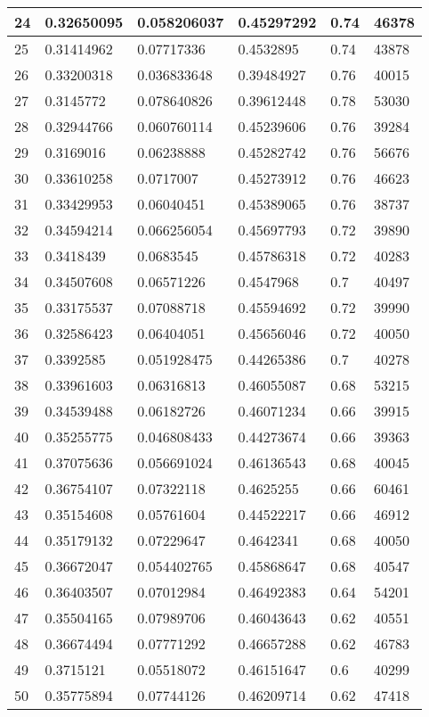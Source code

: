 \begin{longtable}{|l|l|l|l|l|l|}
24 & 0.32650095 & 0.058206037 & 0.45297292 & 0.74 & 46378 \\ \hline 
25 & 0.31414962 & 0.07717336 & 0.4532895 & 0.74 & 43878 \\ \hline 
26 & 0.33200318 & 0.036833648 & 0.39484927 & 0.76 & 40015 \\ \hline 
27 & 0.3145772 & 0.078640826 & 0.39612448 & 0.78 & 53030 \\ \hline 
28 & 0.32944766 & 0.060760114 & 0.45239606 & 0.76 & 39284 \\ \hline 
29 & 0.3169016 & 0.06238888 & 0.45282742 & 0.76 & 56676 \\ \hline 
30 & 0.33610258 & 0.0717007 & 0.45273912 & 0.76 & 46623 \\ \hline 
31 & 0.33429953 & 0.06040451 & 0.45389065 & 0.76 & 38737 \\ \hline 
32 & 0.34594214 & 0.066256054 & 0.45697793 & 0.72 & 39890 \\ \hline 
33 & 0.3418439 & 0.0683545 & 0.45786318 & 0.72 & 40283 \\ \hline 
34 & 0.34507608 & 0.06571226 & 0.4547968 & 0.7 & 40497 \\ \hline 
35 & 0.33175537 & 0.07088718 & 0.45594692 & 0.72 & 39990 \\ \hline 
36 & 0.32586423 & 0.06404051 & 0.45656046 & 0.72 & 40050 \\ \hline 
37 & 0.3392585 & 0.051928475 & 0.44265386 & 0.7 & 40278 \\ \hline 
38 & 0.33961603 & 0.06316813 & 0.46055087 & 0.68 & 53215 \\ \hline 
39 & 0.34539488 & 0.06182726 & 0.46071234 & 0.66 & 39915 \\ \hline 
40 & 0.35255775 & 0.046808433 & 0.44273674 & 0.66 & 39363 \\ \hline 
41 & 0.37075636 & 0.056691024 & 0.46136543 & 0.68 & 40045 \\ \hline 
42 & 0.36754107 & 0.07322118 & 0.4625255 & 0.66 & 60461 \\ \hline 
43 & 0.35154608 & 0.05761604 & 0.44522217 & 0.66 & 46912 \\ \hline 
44 & 0.35179132 & 0.07229647 & 0.4642341 & 0.68 & 40050 \\ \hline 
45 & 0.36672047 & 0.054402765 & 0.45868647 & 0.68 & 40547 \\ \hline 
46 & 0.36403507 & 0.07012984 & 0.46492383 & 0.64 & 54201 \\ \hline 
47 & 0.35504165 & 0.07989706 & 0.46043643 & 0.62 & 40551 \\ \hline 
48 & 0.36674494 & 0.07771292 & 0.46657288 & 0.62 & 46783 \\ \hline 
49 & 0.3715121 & 0.05518072 & 0.46151647 & 0.6 & 40299 \\ \hline 
50 & 0.35775894 & 0.07744126 & 0.46209714 & 0.62 & 47418 \\ \hline 
\end{longtable}